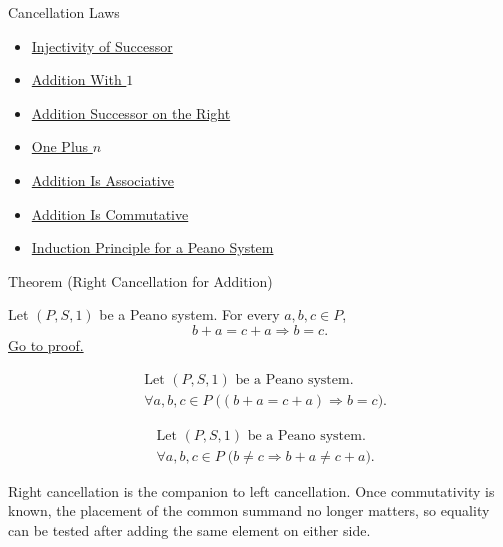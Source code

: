 \begin{topicbox}{Cancellation Laws}
\begin{dependencies}
\begin{itemize}
  \item \hyperref[ax:peano-successor-injective]{Injectivity of Successor}
  \item \hyperref[thm:addition-with-one]{Addition With $1$}
  \item \hyperref[thm:addition-successor-on-right]{Addition Successor on the Right}
  \item \hyperref[thm:one-plus-n]{One Plus $n$}
  \item \hyperref[thm:addition-associative]{Addition Is Associative}
  \item \hyperref[thm:addition-commutative]{Addition Is Commutative}
  \item \hyperref[thm:induction-principle-for-peano-system]{Induction Principle for a Peano System}
\end{itemize}
\end{dependencies}

\begin{theorembox}{Theorem (Right Cancellation for Addition)}
\begin{theorem}
\label{thm:addition-right-cancellation}
Let $(P,S,1)$ be a Peano system. For every $a,b,c \in P$,
\[
b+a=c+a
\Longrightarrow
b=c.
\]
\hyperref[prf:addition-right-cancellation]{Go to proof.}
\end{theorem}
\end{theorembox}

\begin{remark*}
\[
\begin{aligned}
&\text{Let } (P,S,1) \text{ be a Peano system.}\\
&\forall a,b,c \in P\;\bigl((b+a=c+a) \Longrightarrow b=c\bigr).
\end{aligned}
\]
\end{remark*}

\begin{remark*}
\[
\begin{aligned}
&\text{Let } (P,S,1) \text{ be a Peano system.}\\
&\forall a,b,c \in P\;\bigl(b \neq c \Longrightarrow b+a \neq c+a\bigr).
\end{aligned}
\]
\end{remark*}

\begin{remark*}[Interpretation]
Right cancellation is the companion to left cancellation. Once commutativity
is known, the placement of the common summand no longer matters, so equality
can be tested after adding the same element on either side.
\end{remark*}


\end{topicbox}
